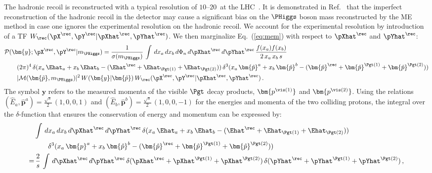 The hadronic recoil is reconstructed with a typical resolution of $10$--$20$~\GeV at the LHC~\cite{CMS-JME-13-003,ATLAS-CONF-2014-019}.
It is demonstrated in Ref.~\cite{Alwall:2010cq} that the imperfect reconstruction of the hadronic recoil
in the detector may cause a significant bias on the $\PHiggs$ boson mass reconstructed by the ME method in case one ignores
the experimental resolution on the
hadronic recoil. We account
for the experimental resolution by introduction
of a TF $W_{\rec}( \pX^{\rec}, \pY^{\rec} | \pXhat^{\rec},
\pYhat^{\rec} )$.
We then marginalize Eq.~(\ref{eq:mem}) with respect to $\pXhat^{\rec}$ and $\pYhat^{\rec}$:
\begin{align}
& \mathcal{P}(\bm{y};\pX^{\rec},\pY^{\rec}|m_{\PHiggs}) =
\frac{1}{\sigma(m_{\PHiggs})} \, \int \, dx_{a} \, dx_{b} \, d\Phi_{n} \,
d\pXhat^{\rec} \, d\pYhat^{\rec} \, \frac{f(x_{a}) f(x_{b})}{2 \,
  x_{a} \, x_{b} \, s} \nonumber \\
& \qquad (2\pi)^{4} \, \delta( x_{a} \, \Ehat_{a} + x_{b} \, \Ehat_{b} -
(\Ehat^{\rec} + \Ehat_{\Pgt(1)} + \Ehat_{\Pgt(2)}) ) \, \delta^{3}( x_{a} \,
\bm{\hat{p}}^{a} + x_{b} \, \bm{\hat{p}}^{b} - (\bm{\hat{p}}^{\rec} + \bm{\hat{p}}^{\Pgt(1)}
+ \bm{\hat{p}}^{\Pgt(2)}) ) \nonumber \\
& \qquad \vert \mathcal{M}(\bm{\tilde{p}},m_{\PHiggs}) \vert^{2} \, W(\bm{y}|\bm{\hat{p}}) \, W_{\rec}( \pX^{\rec}, \pY^{\rec} | \pXhat^{\rec}, \pYhat^{\rec} ) \, .
\label{eq:mem_mod_hadRecoil}
\end{align}
The symbol $\bm{y}$ refers to the measured momenta of the visible $\Pgt$ decay products, $\bm{p^{\vis(1)}}$ and $\bm{p^{\vis(2)}}$.
Using the relations $(\hat{E}_{a},\bm{\hat{p}}^{a}) = \frac{\sqrt{s}}{2} \, (1, 0,
0, 1)$ and $(\hat{E}_{b},\bm{\hat{p}}^{b}) = \frac{\sqrt{s}}{2} \, (1,
0, 0, -1)$
for the energies and momenta of the two colliding protons,
the integral over the $\delta$-function that ensures the conservation of energy and momentum can be expressed by:
\begin{align}
& \int \, dx_{a} \, dx_{b} \, d\pXhat^{\rec} \, d\pYhat^{\rec} \, \delta(
x_{a} \, \Ehat_{a} + x_{b} \, \Ehat_{b} - (\Ehat^{\rec} +
\Ehat_{\Pgt(1)} + \Ehat_{\Pgt(2)})) \nonumber \\
& \qquad \delta^{3}(
x_{a} \, \bm{p}^{a} + x_{b} \, \bm{\hat{p}}^{b} - (\bm{\hat{p}}^{\rec} +
\bm{\hat{p}}^{\Pgt(1)} + \bm{\hat{p}}^{\Pgt(2)})) \nonumber \\
= & \, \frac{2}{s} \, \int \,
d\pXhat^{\rec} \, d\pYhat^{\rec} \, 
\delta( \pXhat^{\rec} + \pXhat^{\Pgt(1)} + \pXhat^{\Pgt(2)} ) \,
\delta( \pYhat^{\rec} + \pYhat^{\Pgt(1)} + \pYhat^{\Pgt(2)} ) \, ,
\label{eq:delta4}
\end{align}
